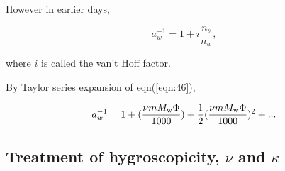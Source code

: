 \documentclass[12pt]{article}
\begin{document}
However in earlier days, 

\begin{equation}
a_{w}^{-1}=1+i \frac{n_{s}}{n_{w}},
\end{equation}

where $i$ is called the van't Hoff factor.

By Taylor series expansion of eqn(\ref{eqn:46}), 

\begin{equation}
a_{w}^{-1}=1+(\frac{\nu m M_{\rm w} \Phi }{1000})+\frac{1}{2}(\frac{\nu m M_{\rm w} \Phi }{1000})^{2}+...
\end{equation}


\subsection{Treatment of hygroscopicity, $\nu$ and $\kappa$}  
 
\end{document}
